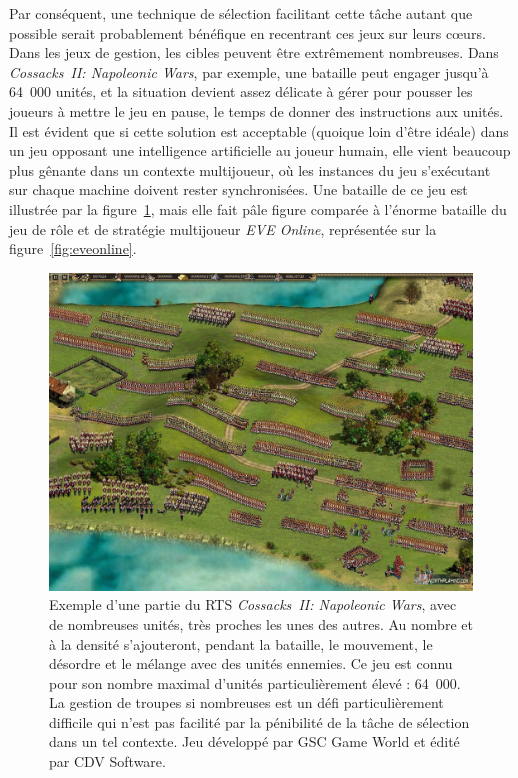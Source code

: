 	Par conséquent, une technique de sélection facilitant cette tâche autant que possible serait probablement bénéfique en recentrant ces jeux sur leurs cœurs. Dans les jeux de gestion, les cibles peuvent être extrêmement nombreuses. Dans \emph{Cossacks~II: Napoleonic Wars}, par exemple, une bataille peut engager jusqu'à 64~000 unités, et la situation devient assez délicate à gérer pour pousser les joueurs à mettre le jeu en pause, le temps de donner des instructions aux unités\footnotemark. Il est évident que si cette solution est acceptable (quoique loin d'être idéale) dans un jeu opposant une intelligence artificielle au joueur humain, elle vient beaucoup plus gênante dans un contexte multijoueur, où les instances du jeu s'exécutant sur chaque machine doivent rester synchronisées. Une bataille de ce jeu est illustrée par la figure~\ref{fig:cossacks2}, mais elle fait pâle figure comparée à l'énorme bataille du jeu de rôle et de stratégie multijoueur \emph{EVE Online}, représentée sur la figure~\ref{fig:eveonline}.
	
	
	\begin{figure}[ht]
		\centering
		\includegraphics[width=\textwidth]{figures/ch1/cossacks2}
		\caption[Un RTS avec de très nombreuses unités : \emph{Cossacks~II: Napoleonic Wars}.]{Exemple d'une partie du RTS \emph{Cossacks~II: Napoleonic Wars}, avec de nombreuses unités, très proches les unes des autres. Au nombre et à la densité s'ajouteront, pendant la bataille, le mouvement, le désordre et le mélange avec des unités ennemies. Ce jeu est connu pour son nombre maximal d'unités particulièrement élevé : 64~000. La gestion de troupes si nombreuses est un défi particulièrement difficile qui n'est pas facilité par la pénibilité de la tâche de sélection dans un tel contexte. Jeu développé par GSC Game World et édité par CDV Software.}
		\label{fig:cossacks2}
	\end{figure}
	
